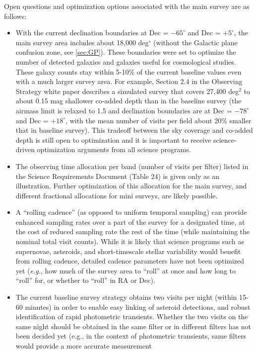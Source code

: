 \documentclass[DM,lsstdraft,toc,usenatbib]{lsstdoc}
\begin{document}
Open questions and optimization options associated with the main survey are as follows: 
\begin{itemize}
\item With the current declination boundaries at Dec = $-65^\circ$ and Dec = $+5^\circ$,
the main survey area includes about 18,000 deg$^\circ$ (without the Galactic plane 
confusion zone, see \ref{sec:GP}). These boundaries were set to optimize the number of
detected galaxies and galaxies useful for cosmological studies. These galaxy counts 
stay within 5-10\% of the current baseline values even with a much larger survey area. 
For example, Section 2.4 in the Observing Strategy white paper describes a simulated survey
that covers 27,400 deg$^2$ to about 0.15 mag shallower co-added depth than in the baseline 
survey (the airmass limit is relaxed to 1.5 and declination boundaries are at Dec = $-78^\circ$ 
and Dec = $+18^\circ$, with the mean number of visits per field about 20\% smaller that
in baseline survey). This tradeoff between the sky coverage and co-added depth is still
open to optimization and it is important to receive science-driven optimization arguments
from all science programs. 
\item The observing time allocation per band (number of visits per filter) listed in the Science Requirements Document
(Table 24) is given only as an illustration. Further optimization of this allocation for the main 
survey, and different fractional allocations for mini surveys, are likely possible. 
\item A ``rolling cadence'' (as opposed to uniform temporal sampling) can provide enhanced
sampling rates over a part of the survey for a designated time, at the
cost of reduced sampling rate the rest of the time (while maintaining the nominal total 
visit counts). While it is likely that science programs such as supernovae, asteroids, and
short-timescale stellar variability would benefit from rolling cadence, detailed cadence
parameters have not been optimized yet ({\it e.g.}, how much of the 
survey area to ``roll'' at once and how long to ``roll'' for, or whether to ``roll'' in RA or Dec). 
\item The current baseline survey strategy obtains two visits per night (within 15-60 minutes) in 
order to enable easy linking of asteroid detections, and robust identification of rapid 
photometric transients. Whether the two visits on the same night should be obtained 
in the same filter or in different filters has not been decided yet (e.g., in the context
of photometric transients, same filters would provide a more accurate measurement

\end{itemize}
\end{document}
